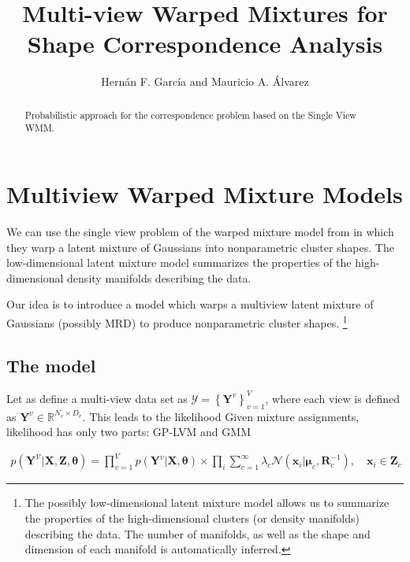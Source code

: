 \documentclass[]{article}
\title{Multi-view Warped Mixtures for Shape Correspondence Analysis}
\author{Hern\'an F. Garc\'ia and Mauricio A. \'Alvarez}
\newcommand{\gD}[2]{\mathcal{N}\left(#1,#2\right)}
\begin{document}
\maketitle

\begin{abstract}
Probabilistic approach for the correspondence problem based on the Single View WMM\cite{IwaDuvGha2012warped}.
\end{abstract}

\section{Multiview Warped Mixture Models}

We can use the single view problem of the warped mixture model from \cite{IwaDuvGha2012warped} in which they warp a latent mixture of Gaussians into nonparametric cluster shapes. The low-dimensional latent mixture model summarizes the properties of the high-dimensional density manifolds describing the data.

Our idea is to introduce a model which warps a multiview latent mixture of Gaussians (possibly MRD) to produce nonparametric cluster shapes. \footnote{The possibly low-dimensional latent mixture model allows us to summarize the properties of the high-dimensional clusters
(or density manifolds) describing the data. The number of manifolds, as well as the shape and dimension of each manifold is automatically inferred.}



\subsection{The model}

Let as define a multi-view data set as $\mathcal{Y}=\left\{\mathbf{Y}^{v}\right\}_{v=1}^{V}$, where each view is defined as $\mathbf{Y}^{v}\in \mathbb{R}^{N_v\times D_v}$. This leads to the likelihood Given mixture assignments, likelihood has only two parts:
GP-LVM and GMM

\begin{align}
p\left(\mathbf{Y}^{\mathcal{V}}|\mathbf{X},\mathbf{Z},\boldsymbol{\theta}\right) = \prod_{v=1}^{V}p(\mathbf{Y}^v|\mathbf{X},\boldsymbol{\theta})\times \prod_{i}\sum_{c=1}^{\infty} \lambda_c\gD{\mathbf{x}_i|\boldsymbol{\mu}_c}{\mathbf{R}_c^{-1}} ,\quad \mathbf{x}_i \in \mathbf{Z}_c
\end{align}
\end{document}
